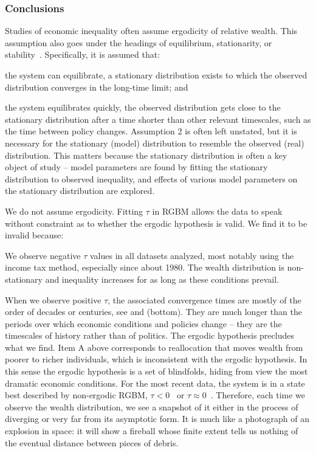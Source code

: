 \subsubsection{Conclusions}\label{sec:conclusions}
Studies of economic inequality often assume ergodicity of relative wealth. This assumption also goes under the headings of equilibrium, stationarity, or stability~\cite{AdamouPeters2016}. Specifically, it is assumed that:
\bi
\item[1.] the system can equilibrate, \ie a stationary distribution exists to which the observed distribution converges in the long-time limit; and
\item[2.] the system equilibrates quickly, \ie the observed distribution gets close to the stationary distribution after a time shorter than other relevant timescales, such as the time between policy changes.
\ei
Assumption 2 is often left unstated, but it is necessary for the stationary (model) distribution to resemble the observed (real) distribution. This matters because the stationary distribution is often a key object of study -- model parameters are found by fitting the stationary distribution to observed inequality, and effects of various model parameters on the stationary distribution are explored.

We do not assume ergodicity. Fitting $\tau$ in RGBM allows the data to speak without constraint as to whether the ergodic hypothesis is valid. We find it to be invalid because:
\bi
\item[A.] We observe negative $\tau$ values in all datasets analyzed, most notably using the income tax method, especially since about 1980. The wealth distribution is non-stationary and inequality increases for as long as these conditions prevail.
\item[B.] When we observe positive $\tau$, the associated convergence times are mostly of the order of decades or centuries, see  and  (bottom). They are much longer than the periods over which economic conditions and policies change -- they are the timescales of history rather than of politics.
\ei
The ergodic hypothesis precludes what we find. Item A above corresponds to reallocation that moves wealth from poorer to richer individuals, which is inconsistent with the ergodic hypothesis. In this sense the ergodic hypothesis is a set of blindfolds, hiding from view the most dramatic economic conditions. For the most recent data, the system is in a state best described by non-ergodic RGBM, $\tau<0$~\cite{SaezZucman2014,WID2017} or $\tau \approx 0$~\cite{bricker2016measuring2}. Therefore, each time we observe the wealth distribution, we see a snapshot of it either in the process of diverging or very far from its asymptotic form. It is much like a photograph of an explosion in space: it will show a fireball whose finite extent tells us nothing of the eventual distance between pieces of debris.

